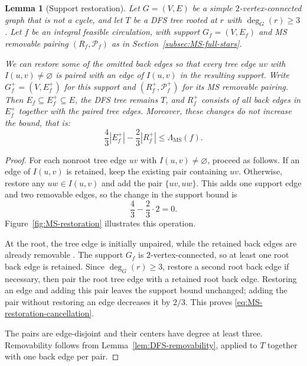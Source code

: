 \documentclass[11pt]{amsart}
\newcommand{\1}{\mathbbm{1}}
\newtheorem{lemma}[theorem]{Lemma}
\begin{document}
\begin{lemma}[Support restoration]
\label{lem:MS-restoration}
Let $G=(V,E)$ be a simple $2$-vertex-connected graph that is
not a cycle, and let $T$ be a DFS tree rooted at $r$ with
$\deg_G(r)\ge3$.
Let $f$ be an integral feasible circulation, with support
$G_f=(V,E_f)$ and \textsc{MS} removable pairing $(R_f,\mathcal P_f)$
as in Section~\ref{subsec:MS-full-stars}.

We can restore some of the omitted back edges so that every
tree edge $uv$ with $I(u,v)\ne\varnothing$ is paired with
an edge of $I(u,v)$ in the resulting support.
Write $G_f^+=(V,E_f^+)$ for this support and
$(R_f^+,\mathcal P_f^+)$ for its \textsc{MS} removable pairing.
Then $E_f\subseteq E_f^+\subseteq E$, the DFS tree remains $T$,
and $R_f^+$ consists of all back edges in $E_f^+$ together
with the paired tree edges. Moreover, these changes do not
increase the bound, that is:
\begin{equation}
\label{eq:MS-restoration-cancellation}
 \frac43|E_f^+|-\frac23|R_f^+|
 \le \Lambda_{\mathrm{MS}}(f).
\end{equation}
\end{lemma}

\begin{proof}
For each nonroot tree edge $uv$ with
$I(u,v)\ne\varnothing$, proceed as follows.
If an edge of $I(u,v)$ is retained, keep the
existing pair containing $uv$.
Otherwise, restore any $uw\in I(u,v)$ and add
the pair $\{uv,uw\}$.
This adds one support edge and two removable edges, so
the change in the support bound is
\[
 \frac43-\frac23\cdot2=0.
\]
Figure~\ref{fig:MS-restoration} illustrates this operation.

At the root, the tree edge is initially unpaired, while
the retained back edges are already removable
\cite[proof of Lemma~12.8]{TraubVygen}.
The support $G_f$ is $2$-vertex-connected, so at least
one root back edge is retained.
Since $\deg_G(r)\ge3$, restore a second root back edge if
necessary, then pair the root tree edge with a retained
root back edge. Restoring an edge and adding this pair
leaves the support bound unchanged; adding the pair
without restoring an edge decreases it by $2/3$.
This proves \eqref{eq:MS-restoration-cancellation}.

The pairs are edge-disjoint and their centers have degree
at least three. Removability follows from
Lemma~\ref{lem:DFS-removability}, applied to $T$
together with one back edge per pair.
\end{proof}
\end{document}
